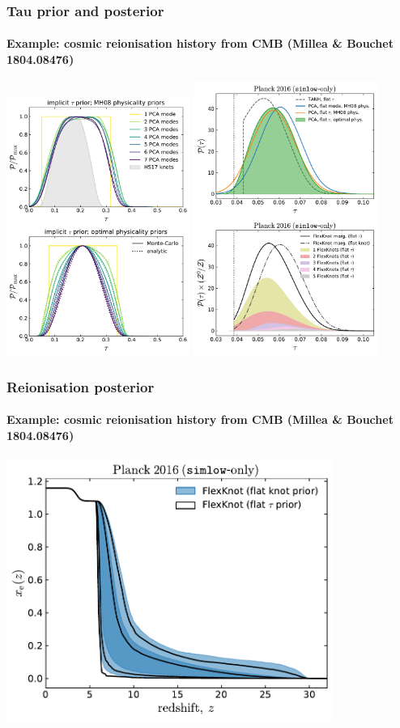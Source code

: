 \documentclass[%
]{beamer}
\begin{document}
\begin{frame}
    \frametitle{Tau prior and posterior}
    \framesubtitle{Example: cosmic reionisation history from CMB (Millea \& Bouchet 1804.08476)}
    \centerline{%
        \includegraphics[width=0.45\textwidth]{figures/implicit_tau_priors}
        \includegraphics[width=0.45\textwidth]{figures/data_simlow}
    }
\end{frame}

\begin{frame}
    \frametitle{Reionisation posterior}
    \framesubtitle{Example: cosmic reionisation history from CMB (Millea \& Bouchet 1804.08476)}
    \centerline{%
        \includegraphics[width=0.8\textwidth]{figures/reio_hists_simlow}
    }
\end{frame}
\end{document}
